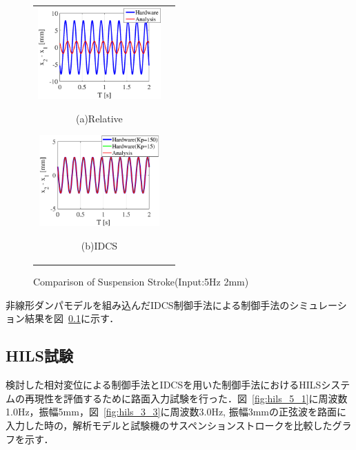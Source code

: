 \documentclass[a4paper,12pt]{article_vdlab_sotsuron}
\begin{document}
\begin{figure}[h]
  \begin{tabular}{cc}
  \begin{minipage}{0.5\hsize}
  \begin{center}
    \includegraphics[height=35mm]{figure/sim_rela_2_5.eps}
    \end{center}
    \begin{center}
    \ (a)Relative\
    \end{center}
  \end{minipage}
  \begin{minipage}{0.5\hsize}
     \begin{center}
      \includegraphics[height=35mm]{figure/sim_idcs_2_5.eps}
      \end{center}
      \begin{center}
      \ (b)IDCS\
    \end{center}
  \end{minipage}
  \end{tabular}
  \vspace*{2mm}
  \caption{Comparison of Suspension Stroke(Input:5Hz 2mm)}
  \label{fig:sim_2_5}
\end{figure}

\newpage
非線形ダンパモデルを組み込んだIDCS制御手法による制御手法のシミュレーション結果を図~\ref{}に示す．

\newpage
\subsection{HILS試験}
検討した相対変位による制御手法とIDCSを用いた制御手法におけるHILSシステムの再現性を評価するために路面入力試験を行った．図~\ref{fig:hils_5_1}に周波数1.0Hz，振幅5mm，図~\ref{fig:hils_3_3}に周波数3.0Hz, 振幅3mmの正弦波を路面に入力した時の，解析モデルと試験機のサスペンションストロークを比較したグラフを示す．
\end{document}
